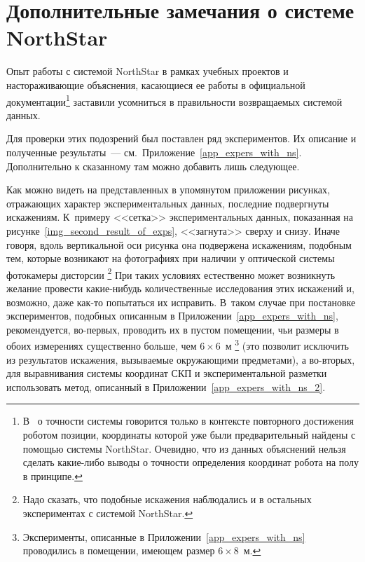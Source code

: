 \chapter{Дополнительные замечания о системе NorthStar}\label{app_about_ns}
Опыт работы с системой NorthStar в рамках учебных проектов и настораживающие объяснения, касающиеся ее работы в официальной документации\lefteqn{,}\footnote{В~\cite[стр.~30--31]{northstar_manual} о точности системы говорится только в контексте повторного достижения роботом позиции, координаты которой уже были предварительный найдены с помощью системы NorthStar.
Очевидно, что из данных объяснений нельзя сделать какие-либо выводы о точности определения координат робота на полу в принципе.}
заставили усомниться в правильности возвращаемых системой данных.

Для проверки этих подозрений был поставлен ряд экспериментов.
Их описание и полученные результаты~--- см.~Приложение~\ref{app_expers_with_ns}.
Дополнительно к сказанному там можно добавить лишь следующее.

Как можно видеть на представленных в упомянутом приложении рисунках, отражающих характер экспериментальных данных, последние подвергнуты искажениям.
К~примеру <<сетка>> экспериментальных данных, показанная на рисунке~\ref{img_second_result_of_exps}, <<загнута>> сверху и снизу.
Иначе говоря, вдоль вертикальной оси рисунка она подвержена искажениям, подобным тем, которые возникают на фотографиях при наличии у оптической системы фотокамеры дисторсии%
\footnote{Надо сказать, что подобные искажения наблюдались и в остальных экспериментах с системой NorthStar.}
При таких условиях естественно может возникнуть желание провести какие-нибудь количественные исследования этих искажений и, возможно, даже как-то попытаться их исправить.
В~таком случае при постановке экспериментов, подобных описанным в Приложении~\ref{app_expers_with_ns}, рекомендуется, во-первых, проводить их в пустом помещении, чьи размеры в обоих измерениях существенно больше, чем $6\times6$~м\lefteqn{,}%
\footnote{Эксперименты, описанные в Приложении~\ref{app_expers_with_ns} проводились в помещении, имеющем размер $6\times8$~м.}
(это позволит исключить из результатов искажения, вызываемые окружающими предметами), а во-вторых, для выравнивания системы координат СКП и экспериментальной разметки использовать метод, описанный в Приложении~\ref{app_expers_with_ns_2}.



